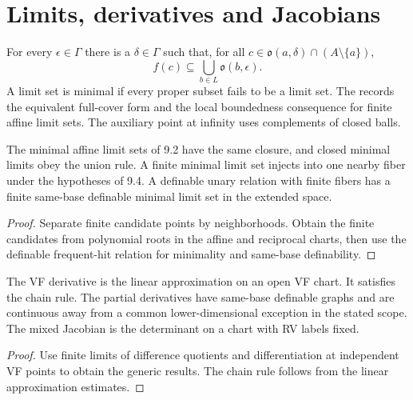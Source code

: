 \section{Limits, derivatives and Jacobians}

\begin{definition}
\label{def:limit-set}
\leanok
For every \(\epsilon\in\Gamma\) there is a \(\delta\in\Gamma\) such
that, for all \(c\in\mathfrak{o}(a,\delta)\cap(A\setminus\{a\})\),
\[
f(c)\subseteq\bigcup_{b\in L}\mathfrak{o}(b,\epsilon).
\]
A limit set is minimal if every proper subset fails to be a limit
set. The  records
the equivalent full-cover form and the local boundedness consequence
for finite affine limit sets. The auxiliary point at infinity uses
complements of closed balls.
\end{definition}

\begin{lemma}
\label{lem:finite-limits}
\leanok
The minimal affine limit sets of 9.2 have the same closure, and
closed minimal limits obey the union rule. A finite minimal limit
set injects into one nearby fiber under the hypotheses of 9.4.
A definable unary relation with finite fibers has a finite
same-base definable minimal limit set in the extended space.
\end{lemma}
\begin{proof}
\leanok
{}
Separate finite candidate points by neighborhoods. Obtain the
finite candidates from polynomial roots in the affine and
reciprocal charts, then use the definable frequent-hit relation
for minimality and same-base definability.
\end{proof}

\begin{lemma}
\label{lem:vf-differentiation}
\leanok
The VF derivative is the linear approximation on an open VF chart.
It satisfies the chain rule. The partial derivatives have same-base
definable graphs and are continuous away from a common
lower-dimensional exception in the stated scope. The mixed Jacobian
is the determinant on a chart with RV labels fixed.
\end{lemma}
\begin{proof}
\leanok
{}
Use finite limits of difference quotients and differentiation at
independent VF points to obtain the generic results. The chain rule
follows from the linear approximation estimates.
\end{proof}

